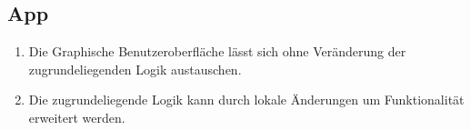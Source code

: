 \subsection{App}

\begin{enumerate}
    \item Die Graphische Benutzeroberfläche lässt sich ohne Veränderung der zugrundeliegenden Logik austauschen.
    \item Die zugrundeliegende Logik kann durch lokale Änderungen um Funktionalität erweitert werden.
\end{enumerate}